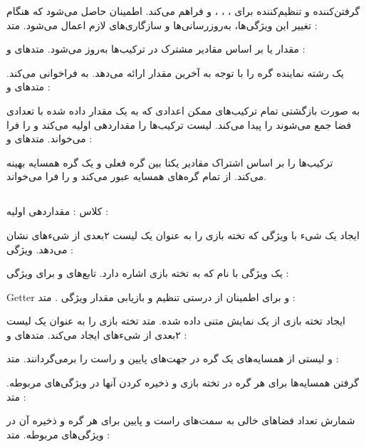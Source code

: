 گرفتن‌کننده و تنظیم‌کننده برای ، ، ، و  فراهم می‌کند.
اطمینان حاصل می‌شود که هنگام تغییر این ویژگی‌ها، به‌روزرسانی‌ها و سازگاری‌های لازم اعمال می‌شود.
متد :

مقدار  یا  بر اساس مقادیر مشترک در ترکیب‌ها به‌روز می‌شود.
متدهای  و :

 یک رشته نماینده گره را با توجه به آخرین مقدار ارائه می‌دهد.
 به  فراخوانی می‌کند.
متدهای  و :

 به صورت بازگشتی تمام ترکیب‌های ممکن اعدادی که به یک مقدار داده شده با تعدادی فضا جمع می‌شوند را پیدا می‌کند.
 لیست ترکیب‌ها را مقداردهی اولیه می‌کند و  را فرا می‌خواند.
متدهای  و :

 ترکیب‌ها را بر اساس اشتراک مقادیر یکتا بین گره فعلی و یک گره همسایه بهینه می‌کند.
 از تمام گره‌های همسایه عبور می‌کند و  را فرا می‌خواند.


\subsection{}
کلاس :
مقداردهی اولیه :

ایجاد یک شیء  با ویژگی  که تخته بازی را به عنوان یک لیست ۲بعدی از شیء‌های  نشان می‌دهد.
ویژگی :

یک ویژگی با نام  که به تخته بازی اشاره دارد.
تابع‌های  و  برای ویژگی :

Getter و  برای اطمینان از درستی تنظیم و بازیابی مقدار ویژگی .
متد :

ایجاد تخته بازی از یک نمایش متنی داده شده.
متد تخته بازی را به عنوان یک لیست ۲بعدی از شیء‌های  ایجاد می‌کند.
متدهای  و :

 و  لیستی از همسایه‌های یک گره در جهت‌های پایین و راست را برمی‌گردانند.
متد :

گرفتن همسایه‌ها برای هر گره در تخته بازی و ذخیره کردن آنها در ویژگی‌های مربوطه.
متد :

شمارش تعداد فضاهای خالی به سمت‌های راست و پایین برای هر گره و ذخیره آن در ویژگی‌های مربوطه.
متد :

